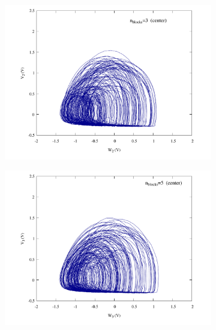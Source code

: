 \begin{figure}
    \centering
    \begin{minipage}{.47\textwidth}
        \begin{subfigure}{\linewidth}
            \centering
            \includegraphics[width=\linewidth]
            {../blocks/3_blocks/middle/attractor.pdf}
        \end{subfigure}
    \end{minipage}
    \begin{minipage}{.47\textwidth}
        \begin{subfigure}{\linewidth}
            \centering
            \includegraphics[width=\linewidth]
            {../blocks/5_blocks/middle/attractor.pdf}

\end{subfigure}
\end{minipage}
\end{figure}
